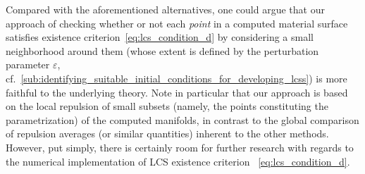 Compared with the aforementioned alternatives, one could argue that our
approach of checking whether or not each \emph{point} in a computed material
surface satisfies existence criterion~\eqref{eq:lcs_condition_d} by considering
a small neighborhood around them (whose extent is defined by the perturbation
parameter $\varepsilon$, cf.\
\cref{sub:identifying_suitable_initial_conditions_for_developing_lcss}) is more
faithful to the underlying theory. Note in particular that our approach is
based on the local repulsion of small subsets (namely, the points constituting
the parametrization) of the computed manifolds, in contrast to the global
comparison of repulsion averages (or similar quantities) inherent to the other
methods. However, put simply, there is certainly room for further research with
regards to the numerical implementation of LCS existence criterion~%
\eqref{eq:lcs_condition_d}.

